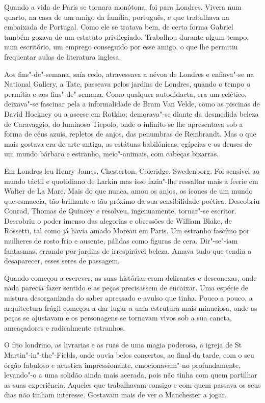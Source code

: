 Quando a vida de Paris se tornara monótona, foi para Londres. Vivera num
quarto, na casa de um amigo da família, português, e que trabalhava na
embaixada de Portugal. Como ele se tratava bem, de certa forma Gabriel
também gozava de um estatuto privilegiado. Trabalhou durante algum
tempo, num escritório, um emprego conseguido por esse amigo, o que lhe
permitiu frequentar aulas de literatura inglesa.

Aos fins"-de"-semana, saía cedo, atravessava a névoa de Londres e
enfiava"-se na National Gallery, a Tate, passeava pelos jardins de
Londres, quando o tempo o permitia e aos fins"-de"-semana. Como qualquer
autodidacta, era um eclético, deixava"-se fascinar pela a informalidade
de Bram Van Velde, como as piscinas de David Hockney ou a ascese em
Rotkho; demorava"-se diante da desmedida beleza de Caravaggio, do
luminoso Tiepolo, onde o infinito se lhe apresentava sob a forma de céus
azuis, repletos de anjos, das penumbras de Rembrandt. Mas o que mais
gostava era de arte antiga, as estátuas babilónicas, egípcias e os
deuses de um mundo bárbaro e estranho, meio"-animais, com cabeças
bizarras.

Em Londres leu Henry James, Chesterton, Coleridge, Swedenborg. Foi
sensível ao mundo táctil e quotidiano de Larkin mas isso fazia"-lhe
ressaltar mais a feerie em Walter de La Mare. Mais do que nunca, amou os
anjos, os ícones de um mundo que esmaecia, tão brilhante e tão próximo
da sua sensibilidade poética. Descobriu Conrad, Thomas de Quincey e
resolveu, ingenuamente, tornar"-se escritor. Descobriu o poder imenso das
alegorias e obsessões de William Blake, de Rossetti, tal como já havia
amado Moreau em Paris. Um estranho fascínio por mulheres de rosto frio e
ausente, pálidas como figuras de cera. Dir"-se"-iam fantasmas, errando por
jardins de irrespirável beleza. Amava tudo que tendia a desaparecer,
esses seres de passagem.

Quando começou a escrever, as suas histórias eram delirantes e
desconexas, onde nada parecia fazer sentido e as peças precisassem de
encaixar. Uma espécie de mistura desorganizada do saber apressado e
avulso que tinha. Pouco a pouco, a arquitectura frágil começou a dar
lugar a uma estrutura mais minuciosa, onde as peças se ajustavam e os
personagens se tornavam vivos sob a sua caneta, ameaçadores e
radicalmente estranhos.

O frio londrino, as livrarias e as ruas de uma magia poderosa, a igreja
de St Martin"-in"-the"-Fields, onde ouvia belos concertos, ao final da
tarde, com o seu órgão fabuloso e acústica impressionante,
emocionavam"-no profundamente, levando"-o a uma solidão ainda mais
acerada, pois não tinha com quem partilhar as suas experiência. Aqueles
que trabalhavam consigo e com quem passava os seus dias não tinham
interesse. Gostavam mais de ver o Manchester a jogar.

